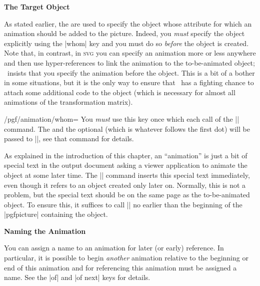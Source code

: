 \begin{command}{\pgfanimateattribute{}}
  \medskip
  \textbf{The Target Object}

  As stated earlier, the  are used to specify the object
  whose attribute for which an animation should be added to the
  picture. Indeed, you \emph{must} specify the object explicitly using
  the |whom| key and you must do so \emph{before} the object is
  created. Note that, in contrast, in \textsc{svg} you can specify an
  animation more or less anywhere and then use hyper-references to
  link the animation to the to-be-animated object; \pgfname\ insists
  that you specify the animation before the object. This is a bit of a
  bother in some situations, but it is the only way to ensure that
  \pgfname\ has a fighting chance to attach some additional code to
  the object (which is necessary for almost all animations of the
  transformation matrix).

  \begin{key}{/pgf/animation/whom=}
    You \emph{must} use this key once which each call of the
    |\pgfanimateattribute| command. The  and the optional
     (which is whatever follows the first dot) will be
    passed to |\pgfidrefnextuse|, see that command for details. 
  \end{key}

  As explained in the introduction of this chapter, an ``animation''
  is just a bit of special text in the output document asking a viewer
  application to animate the object at some later time. The
  |\pgfanimateattribute| command inserts this special text immediately,
  even though it refers to an object created only later on. Normally,
  this is not a problem, but the special text should be on the same
  page as the to-be-animated object. To ensure this, it suffices to
  call |\pgfanimateattribute| no earlier than the beginning of the
  |pgfpicture| containing the object.

  \medskip
  \textbf{Naming the Animation}

  You can assign a name to an animation for later (or early)
  reference. In particular, it is possible to begin \emph{another}
  animation relative to the beginning or end of this animation and for
  referencing this animation must be assigned a name. See the |of| and
  |of next| keys for details.


\end{command}
